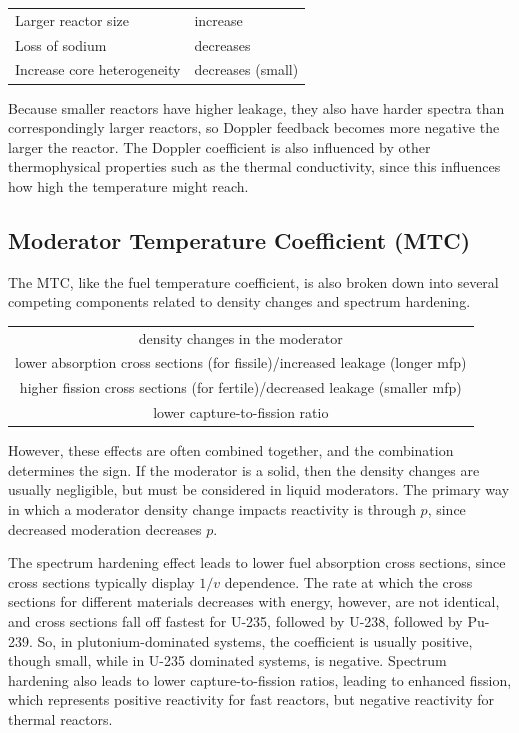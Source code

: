 \documentclass[10pt]{article}
\begin{document}
\begin{flushleft}
\begin{center}
\begin{tabular}{l l}
Larger reactor size & increase\\
Loss of sodium & decreases\\
Increase core heterogeneity & decreases (small)\\
\end{tabular}
\end{center}

Because smaller reactors have higher leakage, they also have harder spectra than correspondingly larger reactors, so Doppler feedback becomes more negative the larger the reactor. The Doppler coefficient is also influenced by other thermophysical properties such as the thermal conductivity, since this influences how high the temperature might reach.

\subsection{Moderator Temperature Coefficient (MTC)}

The MTC, like the fuel temperature coefficient, is also broken down into several competing components related to density changes and spectrum hardening.

\begin{center}
\begin{tabular}{c}
density changes in the moderator\\
lower absorption cross sections (for fissile)/increased leakage (longer mfp)\\
higher fission cross sections (for fertile)/decreased leakage (smaller mfp)\\
lower capture-to-fission ratio\\
\end{tabular}
\end{center}

However, these effects are often combined together, and the combination determines the sign. If the moderator is a solid, then the density changes are usually negligible, but must be considered in liquid moderators. The primary way in which a moderator density change impacts reactivity is through \(p\), since decreased moderation decreases \(p\). 

The spectrum hardening effect leads to lower fuel absorption cross sections, since cross sections typically display \(1/v\) dependence. The rate at which the cross sections for different materials decreases with energy, however, are not identical, and cross sections fall off fastest for U-235, followed by U-238, followed by Pu-239. So, in plutonium-dominated systems, the coefficient is usually positive, though small, while in U-235 dominated systems, is negative. Spectrum hardening also leads to lower capture-to-fission ratios, leading to enhanced fission, which represents positive reactivity for fast reactors, but negative reactivity for thermal reactors. 


\end{flushleft}
\end{document}
